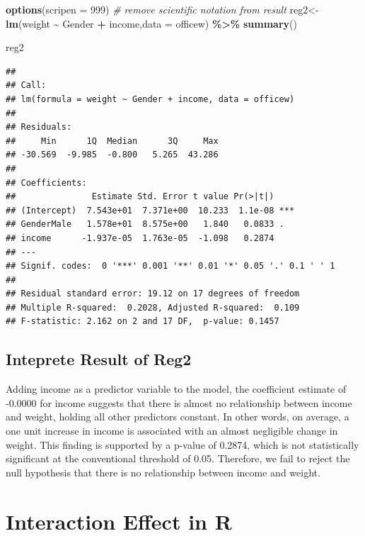 \documentclass[
]{article}
\newenvironment{Shaded}{\begin{snugshade}}{\end{snugshade}}
\newcommand{\AttributeTok}[1]{\textcolor[rgb]{0.13,0.29,0.53}{#1}}
\newcommand{\CommentTok}[1]{\textcolor[rgb]{0.56,0.35,0.01}{\textit{#1}}}
\newcommand{\DecValTok}[1]{\textcolor[rgb]{0.00,0.00,0.81}{#1}}
\newcommand{\FunctionTok}[1]{\textcolor[rgb]{0.13,0.29,0.53}{\textbf{#1}}}
\newcommand{\NormalTok}[1]{#1}
\newcommand{\OtherTok}[1]{\textcolor[rgb]{0.56,0.35,0.01}{#1}}
\newcommand{\SpecialCharTok}[1]{\textcolor[rgb]{0.81,0.36,0.00}{\textbf{#1}}}
\begin{document}
\begin{Shaded}
\begin{Highlighting}[]
\FunctionTok{options}\NormalTok{(}\AttributeTok{scripen =} \DecValTok{999}\NormalTok{) }\CommentTok{\# remove scientific notation from result}
\NormalTok{reg2}\OtherTok{\textless{}{-}} \FunctionTok{lm}\NormalTok{(weight }\SpecialCharTok{\textasciitilde{}}\NormalTok{ Gender }\SpecialCharTok{+}\NormalTok{ income,}\AttributeTok{data =}\NormalTok{ officew) }\SpecialCharTok{\%\textgreater{}\%} 
\FunctionTok{summary}\NormalTok{()}

\NormalTok{reg2}
\end{Highlighting}
\end{Shaded}

\begin{verbatim}
## 
## Call:
## lm(formula = weight ~ Gender + income, data = officew)
## 
## Residuals:
##     Min      1Q  Median      3Q     Max 
## -30.569  -9.985  -0.800   5.265  43.286 
## 
## Coefficients:
##               Estimate Std. Error t value Pr(>|t|)    
## (Intercept)  7.543e+01  7.371e+00  10.233  1.1e-08 ***
## GenderMale   1.578e+01  8.575e+00   1.840   0.0833 .  
## income      -1.937e-05  1.763e-05  -1.098   0.2874    
## ---
## Signif. codes:  0 '***' 0.001 '**' 0.01 '*' 0.05 '.' 0.1 ' ' 1
## 
## Residual standard error: 19.12 on 17 degrees of freedom
## Multiple R-squared:  0.2028, Adjusted R-squared:  0.109 
## F-statistic: 2.162 on 2 and 17 DF,  p-value: 0.1457
\end{verbatim}

\hypertarget{inteprete-result-of-reg2}{%
\subsection{Inteprete Result of Reg2}\label{inteprete-result-of-reg2}}

Adding income as a predictor variable to the model, the coefficient
estimate of -0.0000 for income suggests that there is almost no
relationship between income and weight, holding all other predictors
constant. In other words, on average, a one unit increase in income is
associated with an almost negligible change in weight. This finding is
supported by a p-value of 0.2874, which is not statistically significant
at the conventional threshold of 0.05. Therefore, we fail to reject the
null hypothesis that there is no relationship between income and weight.

\hypertarget{interaction-effect-in-r}{%
\section{Interaction Effect in R}\label{interaction-effect-in-r}}
\end{document}
